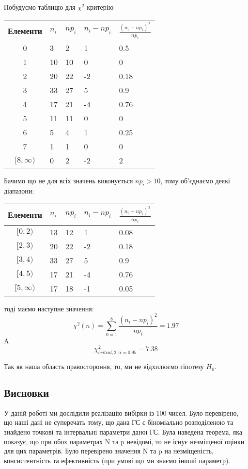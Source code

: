 \documentclass{article}
\begin{document}
Побудуємо таблицю для $\chi^2$ критерію
\begin{center}
\begin{tabular}{|c||m{2cm}|m{2cm}|m{2cm}|m{2cm}|}
    \hline
    Елементи & $n_i$ & $np_i$ & $n_i - np_i$ & $\frac{(n_i - np_i)^2}{np_i}$ \\
    \hline
    \hline
    0 & 3 & 2 & 1 & 0.5 \\
    \hline
    1 & 10 & 10 & 0 & 0 \\
    \hline
    2 & 20 & 22 & -2 & 0.18 \\
    \hline
    3 & 33 & 27 & 5 & 0.9 \\
    \hline
    4 & 17 & 21 & -4 & 0.76 \\
    \hline
    5 & 11 & 11 & 0 & 0 \\
    \hline
    6 & 5  & 4  & 1 & 0.25 \\
    \hline
    7 & 1  & 1  & 0 & 0 \\
    \hline
    $[8, \infty)$ & 0 & 2 & -2 & 2 \\
    \hline
\end{tabular}
\end{center}
Бачимо що не для всіх значень виконується $np_i > 10$, тому об'єднаємо деякі діапазони:
\begin{center}
\begin{tabular}{|c||m{2cm}|m{2cm}|m{2cm}|m{2cm}|}
    \hline
    Елементи & $n_i$ & $np_i$ & $n_i - np_i$ & $\frac{(n_i - np_i)^2}{np_i}$ \\
    \hline
    \hline
    $[0,2)$ & 13 & 12 & 1 & 0.08 \\
    \hline
    $[2, 3)$ & 20 & 22 & -2 & 0.18 \\
    \hline
    $[3, 4)$ & 33 & 27 & 5 & 0.9 \\
    \hline
    $[4, 5)$ & 17 & 21 & -4 & 0.76 \\
    \hline
    $[5,\infty)$  & 17 & 18 & -1 & 0.05 \\
    \hline
\end{tabular}
\end{center}
тоді маємо наступне значення:
$$
\chi^2(n)=\sum_{0=1}^{8} \frac{(n_i - np_i)^2}{np_i} = 1.97
$$
A
$$
\chi_{critcal, 2, \alpha=0.95}^2 = 7.38 
$$

Так як наша область правостороння, то, ми не відхилюємо гіпотезу $H_0$.
\subsection{Висновки}
У даній роботі ми дослідили реалізацію вибірки із 100 чисел. Було перевірено, що наші дані не
суперечать тому, що дана ГС є
біноміально розподіленою та знайдено точкові та інтервальні параметри даної ГС. Була наведена
теорема, яка показує, що при обох параметрах N та p невідомі, то не існує незміщеної оцінки для цих
параметрів.
Було перевірено значення N та p на незміщеність, консистентність та ефективність (при умові що ми
знаємо інший параметр).\\
\end{document}
